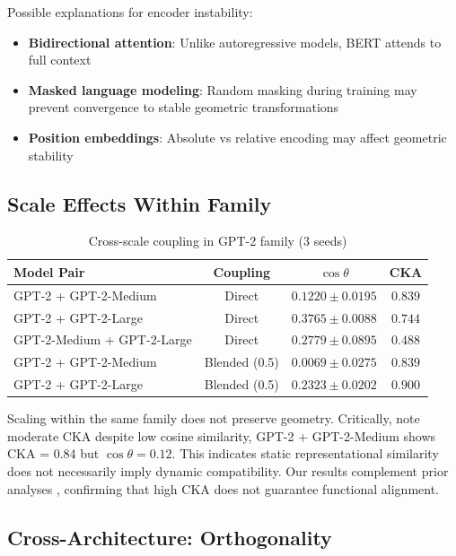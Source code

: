 \documentclass[10pt]{article} %
\theoremstyle{plain}
\theoremstyle{definition}
\theoremstyle{remark}
\begin{document}
Possible explanations for encoder instability:
\begin{itemize}
    \item \textbf{Bidirectional attention}: Unlike autoregressive models, BERT attends to full context
    \item \textbf{Masked language modeling}: Random masking during training may prevent convergence to stable geometric transformations
    \item \textbf{Position embeddings}: Absolute vs relative encoding may affect geometric stability
\end{itemize}

\subsection{Scale Effects Within Family}

\begin{table}[htbp]
\centering
\caption{Cross-scale coupling in GPT-2 family (3 seeds)}
\label{tab:scale}
\small
\begin{tabular}{lccc}
\toprule
\textbf{Model Pair} & \textbf{Coupling} & \textbf{$\cos \theta$} & \textbf{CKA} \\
\midrule
GPT-2 + GPT-2-Medium & Direct & $0.1220 \pm 0.0195$ & $0.839$ \\
GPT-2 + GPT-2-Large & Direct & $0.3765 \pm 0.0088$ & $0.744$ \\
GPT-2-Medium + GPT-2-Large & Direct & $0.2779 \pm 0.0895$ & $0.488$ \\
\midrule
GPT-2 + GPT-2-Medium & Blended (0.5) & $0.0069 \pm 0.0275$ & $0.839$ \\
GPT-2 + GPT-2-Large & Blended (0.5) & $0.2323 \pm 0.0202$ & $0.900$ \\
\bottomrule
\end{tabular}
\end{table}

Scaling within the same family does not preserve geometry. Critically, note moderate CKA despite low cosine similarity, GPT-2 + GPT-2-Medium shows CKA = 0.84 but $\cos \theta = 0.12$. This indicates static representational similarity does not necessarily imply dynamic compatibility. Our results complement prior analyses \citep{hauser2021similar,ding2021grounding}, confirming that high CKA does not guarantee functional alignment.

\subsection{Cross-Architecture: Orthogonality}
\end{document}
